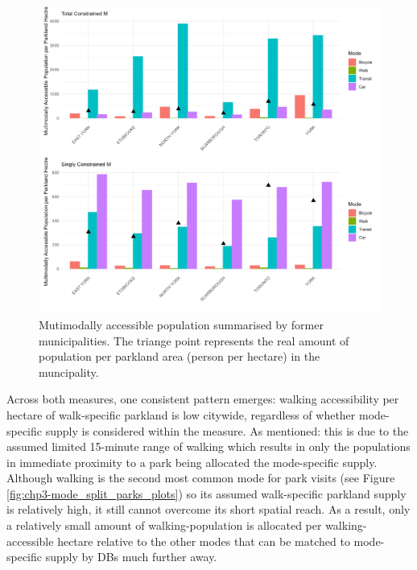 \documentclass[
11pt, %
oneside, %
english, %
singlespacing, %
]{macthesis} %
\begin{document}
\begin{figure}

{\centering \includegraphics[width=6in]{./data/figures/chp5-mm_mm_T_S_muni_plots} 

}

\caption{\label{fig:chp5-mm_vv_T_S_muni_plots} Mutimodally accessible population summarised by former municipalities. The triange point represents the real amount of population per parkland area (person per hectare) in the muncipality.}\label{fig:unnamed-chunk-91}
\end{figure}

Across both measures, one consistent pattern emerges: walking accessibility per hectare of walk-specific parkland is low citywide, regardless of whether mode-specific supply is considered within the measure. As mentioned: this is due to the assumed limited 15-minute range of walking which results in only the populations in immediate proximity to a park being allocated the mode-specific supply. Although walking is the second most common mode for park visits (see Figure \ref{fig:chp3-mode_split_parks_plots}) so its assumed walk-specific parkland supply is relatively high, it still cannot overcome its short spatial reach. As a result, only a relatively small amount of walking-population is allocated per walking-accessible hectare relative to the other modes that can be matched to mode-specific supply by DBs much further away.
\end{document}
